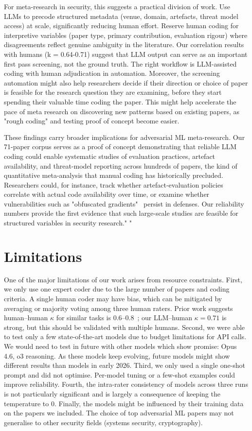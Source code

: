 \documentclass[conference,compsoc]{IEEEtran}
\begin{document}
For meta-research in security, this suggests a practical division of work. Use LLMs to precode structured metadata (venue, domain, artefacts, threat model access) at scale, significantly reducing human effort. Reserve human coding for interpretive variables (paper type, primary contribution, evaluation rigour) where disagreements reflect genuine ambiguity in the literature.  Our correlation results with humans (k = 0.64-0.71) suggest that LLM output can serve as an important first pass screening, not the ground truth. The right workflow is LLM-assisted coding with human adjudication in automation. Moreover, the screening automation might also help researchers decide if their direction or choice of paper is feasible for the research question they are examining, before they start spending their valuable time coding the paper. This might help accelerate the pace of meta research on discovering new patterns based on existing papers, as "rough coding" and testing proof of concept become easier.

These findings carry broader implications for adversarial ML meta-research. Our 71-paper corpus serves as a proof of concept demonstrating that reliable LLM coding could enable systematic studies of evaluation practices, artefact availability, and threat-model reporting across hundreds of papers, the kind of quantitative meta-analysis that manual coding has historically precluded. Researchers could, for instance, track whether artefact-evaluation policies~\cite{usenixsec2025artifacts} correlate with actual code availability over time, or examine whether vulnerabilities such as "obfuscated gradients"~\cite{athalye2018obfuscated} persist in defenses. Our reliability numbers provide the first evidence that such large-scale studies are feasible for structured variables in security research."
"
\section{Limitations}

One of the major limitations of our work arises from resource constraints. First, we only use one expert coder due to the large number of papers and coding criteria. A single human coder may have bias, which can be mitigated by averaging or majority voting among three human raters. Prior work suggests human--human $\kappa$ for similar tasks is 0.6--0.8~\cite{krippendorff2004reliability}; our LLM--human $\kappa = 0.71$ is strong, but this should be validated with multiple humans. Second, we were able to test only a few state-of-the-art models due to budget limitations for API calls. We would need to test in future with other models which show promise: Opus 4.6, o3 reasoning. As these models keep evolving, future models might show different results than models in early 2026. Third, we only used a single one-shot prompt and did not optimise. Per-model tuning or a few-shot examples could improve reliability. Fourth, the intra-rater consistency of models across three runs is not particularly significant and is largely a consequence of keeping the temperature to 0. Finally, the models might be influenced by their training data on the papers we included. The choice of top adversarial ML papers may not generalise to other security fields (systems security, cryptography).
\end{document}
